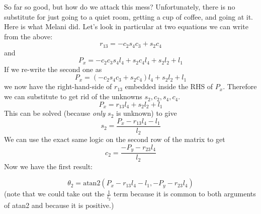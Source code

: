 \begin{ExampleCont}
So far so good, but how do we attack this mess?
Unfortunately, there is no substitute for just going to a quiet room, getting a
cup of coffee, and going at it.   Here is what Melani did.
Let's look in particular at two equations we can write from the above:
\[
r_{13} = -c_2s_4c_3+s_2c_4
\]
and
\[
P_x = -c_2c_3s_4l_4+s_2c_4l_4+s_2l_2+l_1
\]
If we 	%
re-write the second one as	%
\[
P_x = (-c_2s_4c_3+s_2c_4)l_4+s_2l_2+l_1
\]
we now have the right-hand-side of $r_{13}$ embedded inside the RHS of
$P_x$.   Therefore we can
substitute to get rid of the unknowns $ s_2, c_2, s_4, c_4$.	%
\[
P_x = r_{13}l_4 + s_2l_2 + l_1
\]
This can be solved (because {\it only} $s_2$ is unknown) to give	%
\[
s_2 = \frac{P_x-r_{13}l_4 -l_1}{l_2}
\]
We can use the exact same logic on the second row of the matrix to get	%
\[
c_2 = \frac{-P_y-r_{23}l_4}{l_2}
\]
Now we have the first result:

\[
\theta_2 = \mathrm{atan2}(P_x-r_{13}l_4 -l_1,-P_y-r_{23}l_4)
\]
(note that we could take out the $\frac{1}{l_2}$ term because it is common to both	%
arguments of atan2 and because it is positive.)	%

\end{ExampleCont}
